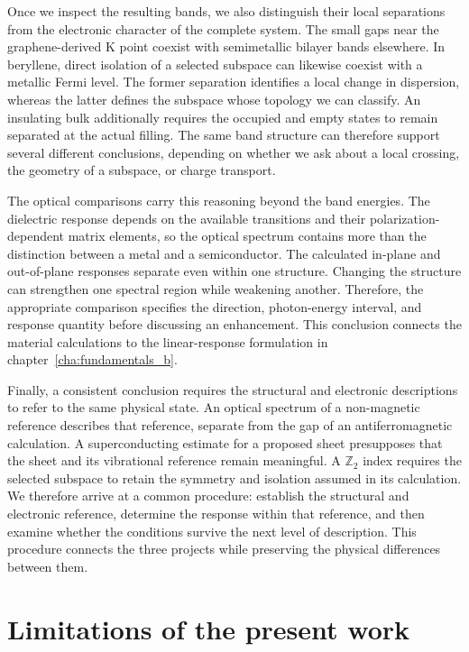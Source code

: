 Once we inspect the resulting bands, we also distinguish their local separations from the electronic character of the complete system.
The small gaps near the graphene-derived $\mathrm{K}$ point coexist with semimetallic bilayer bands elsewhere.
In beryllene, direct isolation of a selected subspace can likewise coexist with a metallic Fermi level.
The former separation identifies a local change in dispersion, whereas the latter defines the subspace whose topology we can classify.
An insulating bulk additionally requires the occupied and empty states to remain separated at the actual filling.
The same band structure can therefore support several different conclusions, depending on whether we ask about a local crossing, the geometry of a subspace, or charge transport.

The optical comparisons carry this reasoning beyond the band energies.
The dielectric response depends on the available transitions and their polarization-dependent matrix elements, so the optical spectrum contains more than the distinction between a metal and a semiconductor.
The calculated in-plane and out-of-plane responses separate even within one structure.
Changing the structure can strengthen one spectral region while weakening another.
Therefore, the appropriate comparison specifies the direction, photon-energy interval, and response quantity before discussing an enhancement.
This conclusion connects the material calculations to the linear-response formulation in chapter~\ref{cha:fundamentals_b}.

Finally, a consistent conclusion requires the structural and electronic descriptions to refer to the same physical state.
An optical spectrum of a non-magnetic reference describes that reference, separate from the gap of an antiferromagnetic calculation.
A superconducting estimate for a proposed sheet presupposes that the sheet and its vibrational reference remain meaningful.
A $\mathbb{Z}_2$ index requires the selected subspace to retain the symmetry and isolation assumed in its calculation.
We therefore arrive at a common procedure: establish the structural and electronic reference, determine the response within that reference, and then examine whether the conditions survive the next level of description.
This procedure connects the three projects while preserving the physical differences between them.

\section{Limitations of the present work}
\label{sec:conclusions_limitations}

